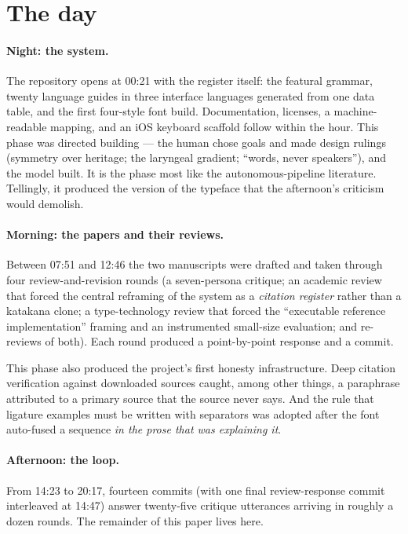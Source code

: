 \documentclass[12pt]{article}
\begin{document}
\section{The day}\label{sec:day}

\paragraph{Night: the system.} The repository opens at 00:21 with the register itself: the featural grammar, twenty language guides in three interface languages generated from one data table, and the first four-style font build. Documentation, licenses, a machine-readable mapping, and an iOS keyboard scaffold follow within the hour. This phase was directed building — the human chose goals and made design rulings (symmetry over heritage; the laryngeal gradient; ``words, never speakers''), and the model built. It is the phase most like the autonomous-pipeline literature. Tellingly, it produced the version of the typeface that the afternoon's criticism would demolish.

\paragraph{Morning: the papers and their reviews.} Between 07:51 and 12:46 the two manuscripts were drafted and taken through four review-and-revision rounds (a seven-persona critique; an academic review that forced the central reframing of the system as a \emph{citation register} rather than a katakana clone; a type-technology review that forced the ``executable reference implementation'' framing and an instrumented small-size evaluation; and re-reviews of both). Each round produced a point-by-point response and a commit.

This phase also produced the project's first honesty infrastructure. Deep citation verification against downloaded sources caught, among other things, a paraphrase attributed to a primary source that the source never says. And the rule that ligature examples must be written with separators was adopted after the font auto-fused a sequence \emph{in the prose that was explaining it}.

\paragraph{Afternoon: the loop.} From 14:23 to 20:17, fourteen commits (with one final review-response commit interleaved at 14:47) answer twenty-five critique utterances arriving in roughly a dozen rounds. The remainder of this paper lives here.
\end{document}
